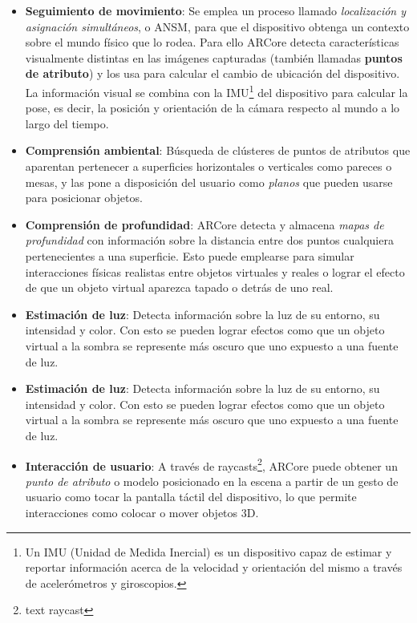 \begin{itemize}
    \item \textbf{Seguimiento de movimiento}: Se emplea un proceso llamado \textit{localización y asignación simultáneos}, o ANSM, para que el dispositivo obtenga un contexto sobre el mundo físico que lo rodea. Para ello ARCore detecta características visualmente distintas en las imágenes capturadas (también llamadas \textbf{puntos de atributo}) y los usa para calcular el cambio de ubicación del dispositivo. La información visual se combina con la IMU\footnote{Un IMU (Unidad de Medida Inercial) es un dispositivo capaz de estimar y reportar información acerca de la velocidad y orientación del mismo a través de acelerómetros y giroscopios.} del dispositivo para calcular la pose, es decir, la posición y orientación de la cámara respecto al mundo a lo largo del tiempo.

    \item \textbf{Comprensión ambiental}: Búsqueda de clústeres de puntos de atributos que aparentan pertenecer a superficies horizontales o verticales como pareces o mesas, y las pone a disposición del usuario como \textit{planos} que pueden usarse para posicionar objetos.

    \item \textbf{Comprensión de profundidad}: ARCore detecta y almacena \textit{mapas de profundidad} con información sobre la distancia entre dos puntos cualquiera pertenecientes a una superficie. Esto puede emplearse para simular interacciones físicas realistas entre objetos virtuales y reales o lograr el efecto de que un objeto virtual aparezca tapado o detrás de uno real.

    \item \textbf{Estimación de luz}: Detecta información sobre la luz de su entorno, su intensidad y color. Con esto se pueden lograr efectos como que un objeto virtual a la sombra se represente más oscuro que uno expuesto a una fuente de luz.

    \item \textbf{Estimación de luz}: Detecta información sobre la luz de su entorno, su intensidad y color. Con esto se pueden lograr efectos como que un objeto virtual a la sombra se represente más oscuro que uno expuesto a una fuente de luz.

    \item \textbf{Interacción de usuario}: A través de raycasts\footnote{text raycast}, ARCore puede obtener un \textit{punto de atributo} o modelo posicionado en la escena a partir de un gesto de usuario como tocar la pantalla táctil del dispositivo, lo que permite interacciones como colocar o mover objetos 3D.


\end{itemize}
